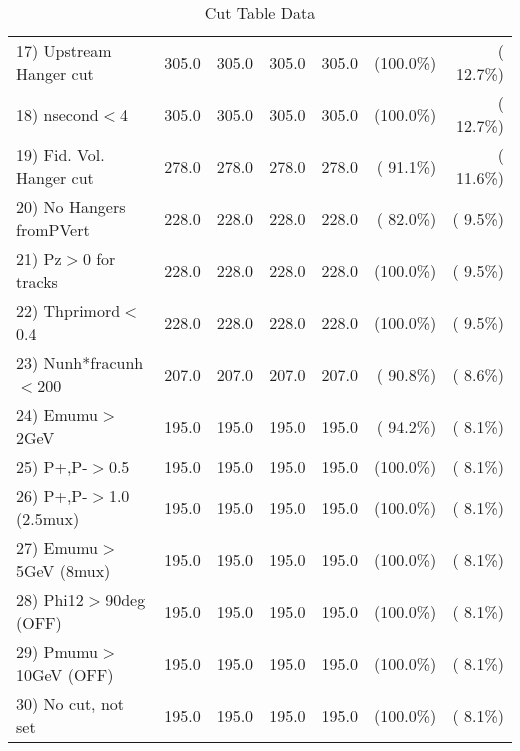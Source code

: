 \begin{table}[h!]
\begin{tabular}{||l||r|r|r|r|r|r||}
 17) Upstream Hanger cut  &        305.0 &        305.0 &        305.0 &        305.0 & (100.0\%) & ( 12.7\%) \\
 18) nsecond$<$4          &        305.0 &        305.0 &        305.0 &        305.0 & (100.0\%) & ( 12.7\%) \\
 19) Fid. Vol. Hanger cut &        278.0 &        278.0 &        278.0 &        278.0 & ( 91.1\%) & ( 11.6\%) \\
 20) No Hangers fromPVert &        228.0 &        228.0 &        228.0 &        228.0 & ( 82.0\%) & (  9.5\%) \\
 21) Pz$>$0 for tracks    &        228.0 &        228.0 &        228.0 &        228.0 & (100.0\%) & (  9.5\%) \\
 22) Thprimord$<$0.4      &        228.0 &        228.0 &        228.0 &        228.0 & (100.0\%) & (  9.5\%) \\
 23) Nunh*fracunh$<$200   &        207.0 &        207.0 &        207.0 &        207.0 & ( 90.8\%) & (  8.6\%) \\
 24) Emumu$>$2GeV         &        195.0 &        195.0 &        195.0 &        195.0 & ( 94.2\%) & (  8.1\%) \\
 25) P+,P-$>$0.5          &        195.0 &        195.0 &        195.0 &        195.0 & (100.0\%) & (  8.1\%) \\
 26) P+,P-$>$1.0 (2.5mux) &        195.0 &        195.0 &        195.0 &        195.0 & (100.0\%) & (  8.1\%) \\
 27) Emumu$>$5GeV  (8mux) &        195.0 &        195.0 &        195.0 &        195.0 & (100.0\%) & (  8.1\%) \\
 28) Phi12$>$90deg  (OFF) &        195.0 &        195.0 &        195.0 &        195.0 & (100.0\%) & (  8.1\%) \\
 29) Pmumu$>$10GeV  (OFF) &        195.0 &        195.0 &        195.0 &        195.0 & (100.0\%) & (  8.1\%) \\
 30) No cut, not set      &        195.0 &        195.0 &        195.0 &        195.0 & (100.0\%) & (  8.1\%) \\
 \hline
 \hline
 \end{tabular}
 \caption{Cut Table  Data     }
 \label{tab-cutcohjpsi-mumu_data}
 \end{table}
